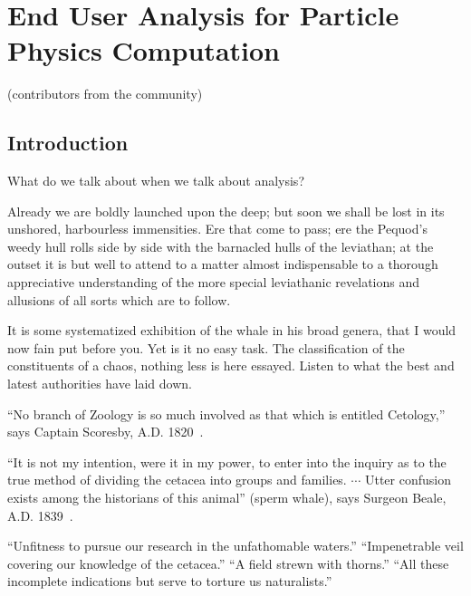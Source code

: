 
\setcounter{chapter}{4} 


\chapter{End User Analysis for Particle Physics Computation}

   {(contributors from the community)}

\section{Introduction}
What do we talk about when we talk about analysis?

Already we are boldly launched upon the deep; but soon we shall be lost in its unshored, harbourless immensities. Ere that come to pass; ere the Pequod’s weedy hull rolls side by side with the barnacled hulls of the leviathan; at the outset it is but well to attend to a matter almost indispensable to a thorough appreciative understanding of the more special leviathanic revelations and allusions of all sorts which are to follow.

It is some systematized exhibition of the whale in his broad genera, that I would now fain put before you. Yet is it no easy task. The classification of the constituents of a chaos, nothing less is here essayed. Listen to what the best and latest authorities have laid down.

``No branch of Zoology is so much involved as that which is entitled Cetology,'' says Captain Scoresby, A.D. 1820~\cite{Comp5-Scoresby}.

``It is not my intention, were it in my power, to enter into the inquiry as to the true method of dividing the cetacea into groups and families. $\cdots$ Utter confusion exists among the historians of this animal'' (sperm whale), says Surgeon Beale, A.D. 1839~\cite{Comp5-Beale}.

``Unfitness to pursue our research in the unfathomable waters.'' ``Impenetrable veil covering our knowledge of the cetacea.''  ``A field strewn with thorns.'' ``All these incomplete indications but serve to torture us naturalists.''


